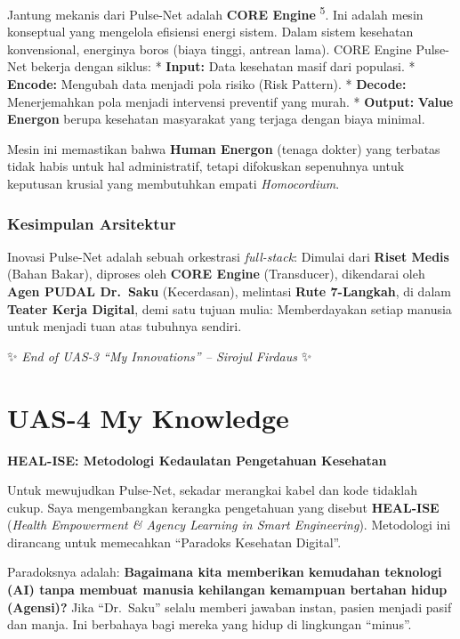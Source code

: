 \documentclass[
  letterpaper,
  DIV=11,
  numbers=noendperiod]{scrreprt}
\begin{document}
Jantung mekanis dari Pulse-Net adalah \textbf{CORE Engine}
\textsuperscript{5}. Ini adalah mesin konseptual yang mengelola
efisiensi energi sistem. Dalam sistem kesehatan konvensional, energinya
boros (biaya tinggi, antrean lama). CORE Engine Pulse-Net bekerja dengan
siklus: * \textbf{Input:} Data kesehatan masif dari populasi. *
\textbf{Encode:} Mengubah data menjadi pola risiko (Risk Pattern). *
\textbf{Decode:} Menerjemahkan pola menjadi intervensi preventif yang
murah. * \textbf{Output:} \textbf{Value Energon} berupa kesehatan
masyarakat yang terjaga dengan biaya minimal.

Mesin ini memastikan bahwa \textbf{Human Energon} (tenaga dokter) yang
terbatas tidak habis untuk hal administratif, tetapi difokuskan
sepenuhnya untuk keputusan krusial yang membutuhkan empati
\emph{Homocordium}.

\subsection{Kesimpulan Arsitektur}\label{kesimpulan-arsitektur}

Inovasi Pulse-Net adalah sebuah orkestrasi \emph{full-stack}: Dimulai
dari \textbf{Riset Medis} (Bahan Bakar), diproses oleh \textbf{CORE
Engine} (Transducer), dikendarai oleh \textbf{Agen PUDAL Dr.~Saku}
(Kecerdasan), melintasi \textbf{Rute 7-Langkah}, di dalam \textbf{Teater
Kerja Digital}, demi satu tujuan mulia: Memberdayakan setiap manusia
untuk menjadi tuan atas tubuhnya sendiri.

✨ \emph{End of UAS-3 ``My Innovations'' -- Sirojul Firdaus} ✨

\chapter{UAS-4 My Knowledge}\label{uas-4-my-knowledge}

\textbf{HEAL-ISE: Metodologi Kedaulatan Pengetahuan Kesehatan}

Untuk mewujudkan Pulse-Net, sekadar merangkai kabel dan kode tidaklah
cukup. Saya mengembangkan kerangka pengetahuan yang disebut
\textbf{HEAL-ISE} (\emph{Health Empowerment \& Agency Learning in Smart
Engineering}). Metodologi ini dirancang untuk memecahkan ``Paradoks
Kesehatan Digital''.

Paradoksnya adalah: \textbf{Bagaimana kita memberikan kemudahan
teknologi (AI) tanpa membuat manusia kehilangan kemampuan bertahan hidup
(Agensi)?} Jika ``Dr.~Saku'' selalu memberi jawaban instan, pasien
menjadi pasif dan manja. Ini berbahaya bagi mereka yang hidup di
lingkungan ``minus''.
\end{document}
